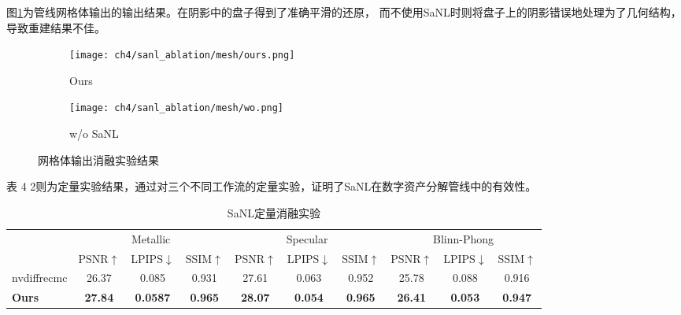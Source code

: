 图\ref{fig:mesh_ablation}为管线网格体输出的输出结果。在阴影中的盘子得到了准确平滑的还原，
而不使用SaNL时则将盘子上的阴影错误地处理为了几何结构，导致重建结果不佳。

\begin{figure}[H]
  \centering
  \begin{subfigure}[c]{0.47\textwidth}
    \centering
    \texttt{[image: ch4/sanl\_ablation/mesh/ours.png]}
    \caption{Ours}
  \end{subfigure}
  \begin{subfigure}[c]{0.47\textwidth}
    \centering
    \texttt{[image: ch4/sanl\_ablation/mesh/wo.png]}
    \caption{w/o SaNL}
  \end{subfigure}
  \caption{网格体输出消融实验结果}
  \label{fig:mesh_ablation}
\end{figure}

表 4 2则为定量实验结果，通过对三个不同工作流的定量实验，证明了SaNL在数字资产分解管线中的有效性。

\begin{table}[h]
  \centering
  \caption{SaNL定量消融实验}
  \begin{tabular}{l ccc ccc ccc}
      \toprule
      & \multicolumn{3}{c}{Metallic} & \multicolumn{3}{c}{Specular} & \multicolumn{3}{c}{Blinn-Phong} \\
      \cmidrule(lr){2-4} \cmidrule(lr){5-7} \cmidrule(lr){8-10}
      & PSNR$\uparrow$ & LPIPS$\downarrow$ & SSIM$\uparrow$ & PSNR$\uparrow$ & LPIPS$\downarrow$ & SSIM$\uparrow$ & PSNR$\uparrow$ & LPIPS$\downarrow$ & SSIM$\uparrow$ \\
      \midrule
      nvdiffrecmc & 26.37 & 0.085 & 0.931 & 27.61 & 0.063 & 0.952 & 25.78 & 0.088 & 0.916 \\
      \textbf{Ours} & \textbf{27.84} & \textbf{0.0587} & \textbf{0.965} & \textbf{28.07} & \textbf{0.054} & \textbf{0.965} & \textbf{26.41} & \textbf{0.053} & \textbf{0.947} \\
      \bottomrule
  \end{tabular}
  \label{tab:sanl_quan}
\end{table}



